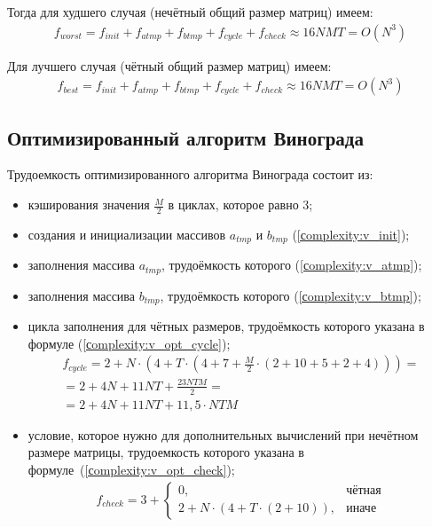 Тогда для худшего случая (нечётный общий размер матриц) имеем:
\begin{equation}
	\label{сomplexity:vinograd_worst}
	\begin{gathered}
		f_{worst} = f_{init} + f_{atmp} + f_{btmp} + f_{cycle} + f_{check} \approx 16NMT = O(N^3)
	\end{gathered}
\end{equation}

Для лучшего случая (чётный общий размер матриц) имеем:
\begin{equation}
	\label{сomplexity:vinograd_best}
	\begin{gathered}
		f_{best} = f_{init} + f_{atmp} + f_{btmp} + f_{cycle} + f_{check} \approx 16NMT = O(N^3)
	\end{gathered}
\end{equation}

\subsection{Оптимизированный алгоритм Винограда}

Трудоемкость оптимизированного алгоритма Винограда состоит из:
\begin{itemize}[label=---]
	\item кэширования значения $\frac{M}{2}$ в циклах, которое равно 3;
	\item создания и инициализации массивов $a_{tmp}$ и $b_{tmp}$ (\ref{сomplexity:v_init});
	\item заполнения массива $a_{tmp}$, трудоёмкость которого (\ref{сomplexity:v_atmp});
	\item заполнения массива $b_{tmp}$, трудоёмкость которого (\ref{сomplexity:v_btmp});
	\item цикла заполнения для чётных размеров, трудоёмкость которого указана в формуле (\ref{сomplexity:v_opt_cycle});
	\begin{equation}
		\label{сomplexity:v_opt_cycle}
		\begin{aligned}
			f_{cycle} = 2 + N \cdot (4 + T \cdot (4 + 7 + \frac{M}{2} \cdot (2 + 10 + 5 + 2 + 4))) = \\
			= 2 + 4N + 11NT + \frac{23NTM}{2}  =\\
			= 2 + 4N + 11NT + 11,5 \cdot NTM 
		\end{aligned}
	\end{equation}
	\item условие, которое нужно для дополнительных вычислений при нечётном размере матрицы, трудоемкость которого указана в формуле~(\ref{сomplexity:v_opt_check});
	\begin{equation}
		\label{сomplexity:v_opt_check}
		\begin{aligned}
			f_{check} = 3 + 
			\begin{cases}
				0, & \text{чётная} \\
				2 + N \cdot (4 + T \cdot (2 + 10)), & \text{иначе}
			\end{cases}
		\end{aligned}  
	\end{equation}
\end{itemize}

